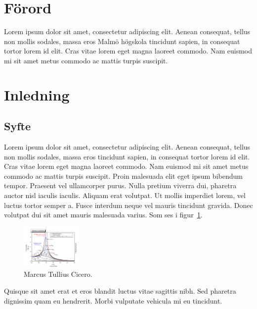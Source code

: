 \documentclass[11pt,a4paper]{article}
\begin{document}


\tableofcontents

\newpage
\section*{Förord}
%

Lorem ipsum dolor sit amet, consectetur adipiscing elit. Aenean
consequat, tellus non mollis sodales, massa eros Malmö högskola
tincidunt sapien, in consequat tortor lorem id elit. Cras vitae lorem
eget magna laoreet commodo. Nam euismod mi sit amet metus commodo ac
mattis turpis suscipit.

\newpage
\section{Inledning}
\subsection{Syfte}
Lorem ipsum dolor sit amet, consectetur adipiscing elit. Aenean
consequat, tellus non mollis sodales, massa eros tincidunt sapien, in
consequat tortor lorem id elit. Cras vitae lorem eget magna laoreet
commodo. Nam euismod mi sit amet metus commodo ac mattis turpis
suscipit. Proin malesuada elit eget ipsum bibendum tempor. Praesent
vel ullamcorper purus. Nulla pretium viverra dui, pharetra auctor nisl
iaculis iaculis. Aliquam erat volutpat. Ut mollis imperdiet lorem, vel
luctus tortor semper a. Fusce interdum neque vel mauris tincidunt
gravida. Donec volutpat dui sit amet mauris malesuada varius. Som ses
i figur~\ref{fig1}.


\begin{figure}[hbt]
  \begin{center}
    \includegraphics[width=3cm,angle=0]{fig1.png}
    \caption{Marcus Tullius Cicero.}
    \label{fig1}
  \end{center}
\end{figure}

Quisque sit amet erat et eros blandit luctus vitae sagittis nibh. Sed
pharetra dignissim quam eu hendrerit. Morbi vulputate vehicula mi eu
tincidunt.
\end{document}
